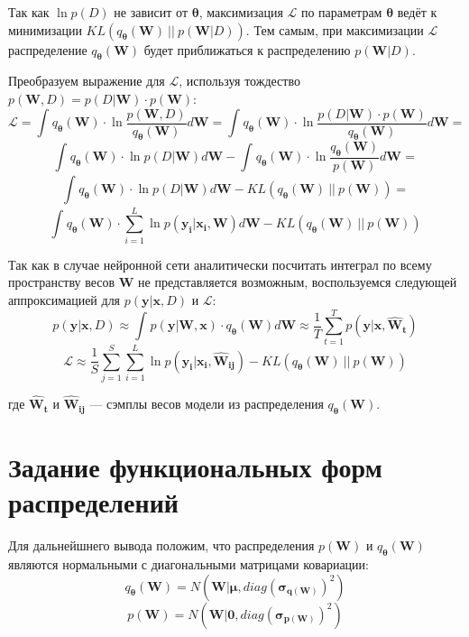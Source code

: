 \documentclass{article}
\begin{document}
    Так как $\ln{p(D)}$ не зависит от $\pmb{\theta}$, максимизация $\mathcal{L}$ по параметрам $\pmb{\theta}$ ведёт к минимизации $KL(q_{\pmb{\theta}}(\pmb{W})~||~p(\pmb{W}| D))$. Тем самым, при максимизации $\mathcal{L}$ распределение $q_{\pmb{\theta}}(\pmb{W})$ будет приближаться к распределению $p(\pmb{W}| D)$.

    Преобразуем выражение для $\mathcal{L}$, используя тождество $p(\pmb{W}, D) = p(D | \pmb{W}) \cdot p(\pmb{W})$:
    \[
    \mathcal{L} =
    \int_{}{} q_{\pmb{\theta}}(\pmb{W}) \cdot \ln{\dfrac{p(\pmb{W}, D)}{q_{\pmb{\theta}}(\pmb{W})}} d \pmb{W} =
    \int_{}{} q_{\pmb{\theta}}(\pmb{W}) \cdot \ln{\dfrac{p(D | \pmb{W}) \cdot p(\pmb{W})}{q_{\pmb{\theta}}(\pmb{W})}} d \pmb{W} =
    \]\[
    \int_{}{} q_{\pmb{\theta}}(\pmb{W}) \cdot \ln{p(D | \pmb{W})} d \pmb{W} - \int_{}{} q_{\pmb{\theta}}(\pmb{W}) \cdot \ln{\dfrac{q_{\pmb{\theta}}(\pmb{W})}{p(\pmb{W})}} d \pmb{W} =
    \]\[
    \int_{}{} q_{\pmb{\theta}}(\pmb{W}) \cdot \ln{p(D | \pmb{W})} d \pmb{W} - KL(q_{\pmb{\theta}}(\pmb{W})~||~p(\pmb{W})) =
    \]\[
    \int_{}{} q_{\pmb{\theta}}(\pmb{W}) \cdot \sum_{i=1}^{L} {\ln{p(\pmb{y_{i}} | \pmb{x_{i}}, \pmb{W})}} d \pmb{W} - KL(q_{\pmb{\theta}}(\pmb{W})~||~p(\pmb{W}))
    \]

    Так как в случае нейронной сети аналитически посчитать интеграл по всему пространству весов $\pmb{W}$ не представляется возможным, воспользуемся следующей аппроксимацией для $p(\pmb{y} | \pmb{x}, D)$ и $\mathcal{L}$:
    \[
    p(\pmb{y} | \pmb{x}, D) \approx
    \int_{}{} p(\pmb{y} | \pmb{W}, \pmb{x}) \cdot q_{\pmb{\theta}}(\pmb{W}) d \pmb{W} \approx
    \dfrac{1}{T} \sum_{t=1}^{T}{p(\pmb{y} | \pmb{x}, \pmb{\hat{W}_{t}})}
    \]
    \[
    \mathcal{L} \approx
    \dfrac{1}{S} \sum_{j=1}^S \sum_{i=1}^{L} {\ln{p(\pmb{y_{i}} | \pmb{x_{i}}, \pmb{\hat{W}_{ij}})}} - KL(q_{\pmb{\theta}}(\pmb{W})~||~p(\pmb{W}))
    \]

    где $\pmb{\hat{W}_{t}}$ и $\pmb{\hat{W}_{ij}}$ --- сэмплы весов модели из распределения $q_{\pmb{\theta}}(\pmb{W})$.

    \section{Задание функциональных форм распределений}

    Для дальнейшнего вывода положим, что распределения $p(\pmb{W})$ и $q_{\pmb{\theta}}(\pmb{W})$ являются нормальными с диагональными матрицами ковариации:
    \[
    q_{\pmb{\theta}}(\pmb{W}) = N(\pmb{W} | \pmb{\mu}, diag(\pmb{\sigma_{q(\pmb{W})}})^{2})
    \]
    \[
    p(\pmb{W}) = N(\pmb{W} | \pmb{0}, diag(\pmb{\sigma_{p(\pmb{W})}})^{2})
    \]
\end{document}
